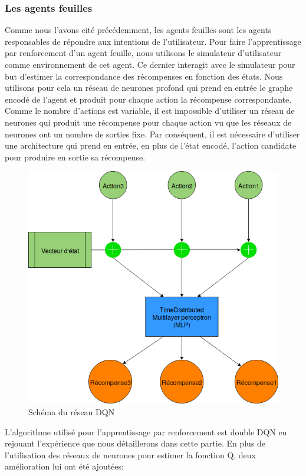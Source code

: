\subsubsection*{Les agents feuilles}
Comme nous l'avons cité précédemment, les agents feuilles sont les agents responsables de répondre aux intentions de l'utilisateur. Pour faire l'apprentissage par renforcement d'un agent feuille, nous utilisons le simulateur d'utilisateur comme environnement de cet agent. Ce dernier interagit avec le simulateur pour but d'estimer la correspondance des récompenses en fonction des états. Nous utilisons pour cela un réseau de neurones profond qui prend en entrée le graphe encodé de l'agent et produit pour chaque action la récompense correspondante. Comme le nombre d'actions est variable, il est impossible d'utiliser un réseau de neurones qui produit une récompense pour chaque action vu que les réseaux de neurones ont un nombre de sorties fixe. Par conséquent, il est nécessaire d'utiliser une architecture qui prend en entrée, en plus de l'état encodé, l'action candidate pour produire en sortie sa récompense.\newpage
\begin{figure}[H]
	\centering
	\includegraphics[width=0.5\linewidth]{images/Conception/DM/time_dist.png}
	\caption{Schéma du réseau DQN}
\end{figure}\label{time_dist}
L'algorithme utilisé pour l'apprentissage par renforcement est double DQN en rejouant l'expérience que nous détaillerons dans cette partie. En plus de l'utilisation des réseaux de neurones pour estimer la fonction Q, deux amélioration lui ont été ajoutées:
